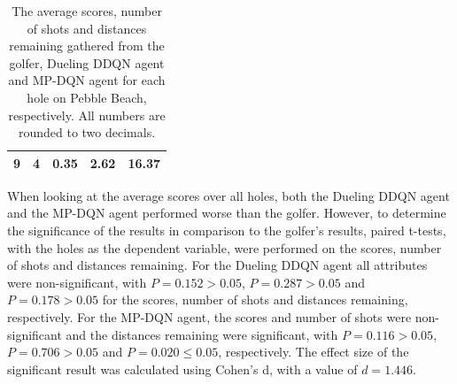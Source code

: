 \documentclass{kththesis}
\begin{document}
\begin{table}
\begin{subtable}{0.3\textwidth}
{\begin{tabular}{|c|c|c|c|c|}
        9 & 4 & 0.35 & 2.62 & 16.37 \\ \hline
    \end{tabular}
    }
    \end{subtable}
    \hfill
    \begin{subtable}{0.3\textwidth}
    \centering
    \end{subtable}
    \caption{The average scores, number of shots and distances remaining gathered from the golfer, Dueling DDQN agent and MP-DQN agent for each hole on Pebble Beach, respectively. All numbers are rounded to two decimals.}
    \label{tab:pebble_average_results}
\end{table}

When looking at the average scores over all holes, both the Dueling DDQN agent and the MP-DQN agent performed worse than the golfer. However, to determine the significance of the results in comparison to the golfer's results, paired t-tests, with the holes as the dependent variable, were performed on the scores, number of shots and distances remaining. For the Dueling DDQN agent all attributes were non-significant, with $P = 0.152 > 0.05$, $P = 0.287 > 0.05$ and $P = 0.178 > 0.05$ for the scores, number of shots and distances remaining, respectively. For the MP-DQN agent, the scores and number of shots were non-significant and the distances remaining were significant, with $P = 0.116 > 0.05$, $P = 0.706 > 0.05$ and $P = 0.020 \leq 0.05$, respectively. The effect size of the significant result was calculated using Cohen's d, with a value of $d = 1.446$.
\end{document}
